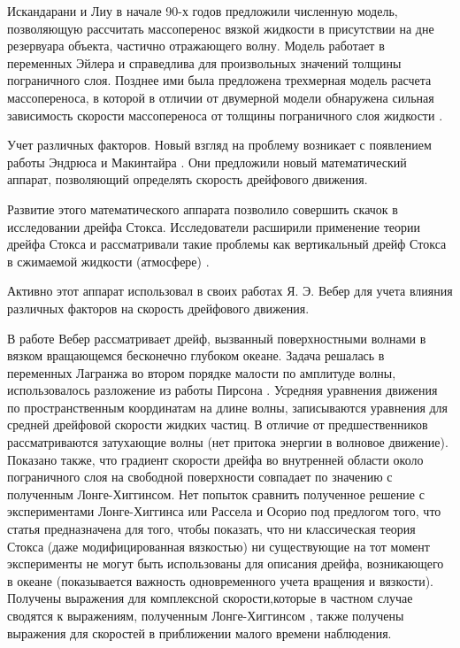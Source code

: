 Искандарани и Лиу в начале 90-х годов \cite{iskandarani1991mass} предложили численную модель, позволяющую рассчитать массоперенос вязкой жидкости в присутствии на дне резервуара объекта, частично отражающего волну. Модель работает в переменных Эйлера и справедлива для произвольных значений толщины пограничного слоя. Позднее ими была предложена трехмерная модель расчета массопереноса, в которой в отличии от двумерной модели обнаружена сильная зависимость скорости массопереноса от толщины пограничного слоя жидкости \cite{iskandarani1991massb}.



Учет различных факторов.
Новый взгляд на проблему возникает с появлением работы Эндрюса и Макинтайра \cite{andrews1978exact}. Они предложили новый математический аппарат, позволяющий определять скорость дрейфового движения. 

Развитие этого математического аппарата позволило совершить скачок в исследовании дрейфа Стокса. Исследователи расширили применение теории дрейфа Стокса и рассматривали такие проблемы как вертикальный дрейф Стокса в сжимаемой жидкости (атмосфере) \cite{coy1986stokes}.

Активно этот аппарат использовал в своих работах Я. Э. Вебер для учета влияния различных факторов на скорость дрейфового движения. 

В работе \cite{weber1983attenuated} Вебер рассматривает дрейф, вызванный поверхностными волнами в вязком вращающемся бесконечно глубоком океане. Задача решалась в переменных Лагранжа во втором порядке малости по амплитуде волны, использовалось разложение из работы Пирсона \cite{pierson1962perturbation}. Усредняя уравнения движения по пространственным координатам на длине волны, записываются уравнения для средней дрейфовой скорости жидких частиц. В отличие от предшественников рассматриваются затухающие волны (нет притока энергии в волновое движение). Показано также, что градиент скорости дрейфа во внутренней области около пограничного слоя на свободной поверхности совпадает по значению с полученным Лонге-Хиггинсом. Нет попыток сравнить полученное решение с экспериментами Лонге-Хиггинса \cite{longuet1960mass} или Рассела и Осорио \cite{russell1957experimental} под предлогом того, что статья предназначена для того, чтобы показать, что ни классическая теория Стокса (даже модифицированная вязкостью) ни существующие на тот момент эксперименты не могут быть использованы для описания дрейфа, возникающего в океане (показывается важность одновременного учета вращения и вязкости). Получены выражения для комплексной скорости,которые в частном случае сводятся к выражениям, полученным Лонге-Хиггинсом \cite{longuet1969nonlinear}, также получены выражения для скоростей в приближении малого времени наблюдения.


